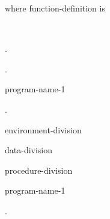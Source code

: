 where function-definition is\vspace{1em}\newline
\begin{0-1}
  \begin{1=}
     \\
  \end{1=}
  .
\end{0-1} \newline
{}.
\begin{1=}
  program-name-1 \\
  \miscext{\literal}
\end{1=}
\begin{0-1}  \literal \end{0-1}.\newline
{} \newline
\begin{0-1}
  environment-division
\end{0-1} \newline
\begin{0-1}
  data-division
\end{0-1} \newline
\begin{0-1}
  procedure-division
\end{0-1} \newline
{} 
\begin{1=}
  program-name-1 \\
\end{1=}.


